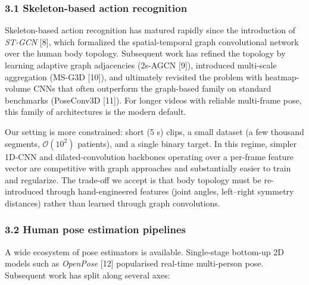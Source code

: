 \documentclass[
  11pt,
]{article}
\begin{document}
\subsubsection{3.1 Skeleton-based action
recognition}\label{skeleton-based-action-recognition}

Skeleton-based action recognition has matured rapidly since the
introduction of \emph{ST-GCN} {[}8{]}, which formalized the
spatial-temporal graph convolutional network over the human body
topology. Subsequent work has refined the topology by learning adaptive
graph adjacencies (2s-AGCN {[}9{]}), introduced multi-scale aggregation
(MS-G3D {[}10{]}), and ultimately revisited the problem with
heatmap-volume CNNs that often outperform the graph-based family on
standard benchmarks (PoseConv3D {[}11{]}). For longer videos with
reliable multi-frame pose, this family of architectures is the modern
default.

Our setting is more constrained: short (5 s) clips, a small dataset (a
few thousand segments, \(\mathcal{O}(10^2)\) patients), and a single
binary target. In this regime, simpler 1D-CNN and dilated-convolution
backbones operating over a per-frame feature vector are competitive with
graph approaches and substantially easier to train and regularize. The
trade-off we accept is that body topology must be re-introduced through
hand-engineered features (joint angles, left--right symmetry distances)
rather than learned through graph convolutions.

\subsubsection{3.2 Human pose estimation
pipelines}\label{human-pose-estimation-pipelines}

A wide ecosystem of pose estimators is available. Single-stage bottom-up
2D models such as \emph{OpenPose} {[}12{]} popularised real-time
multi-person pose. Subsequent work has split along several axes:
\end{document}
